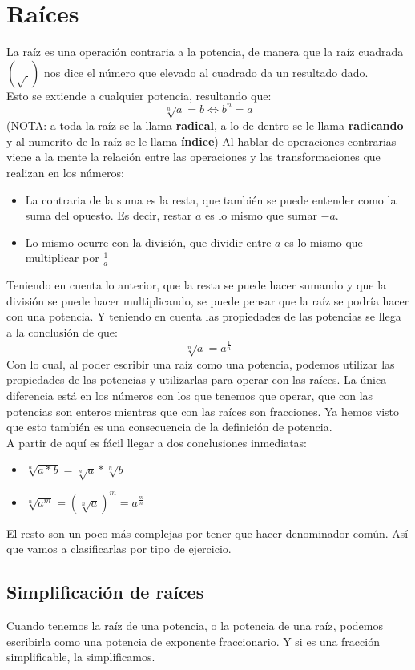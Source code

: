 \documentclass[a4paper,11pt,answers]{exam}
\begin{document}
\section{Raíces}
La raíz es una operación contraria a la potencia, de manera que la raíz cuadrada $\left(\sqrt{\ }\right)$ nos dice el número que elevado al cuadrado da un resultado dado.\\
Esto se extiende a cualquier potencia, resultando que:
\[\sqrt[n]{a} = b \Leftrightarrow b^n = a\]
(NOTA: a toda la raíz se la llama \textbf{radical}, a lo de dentro se le llama \textbf{radicando} y al numerito de la raíz se le llama \textbf{índice})
Al hablar de operaciones contrarias viene a la mente la relación entre las operaciones y las transformaciones que realizan en los números:
\begin{itemize}
	\item La contraria de la suma es la resta, que también se puede entender como la suma del opuesto. Es decir, restar $a$ es lo mismo que sumar $-a$.
	\item Lo mismo ocurre con la división, que dividir entre $a$ es lo mismo que multiplicar por $\frac{1}{a}$
\end{itemize}
Teniendo en cuenta lo anterior, que la resta se puede hacer sumando y que la división se puede hacer multiplicando, se puede pensar que la raíz se podría hacer con una potencia. Y teniendo en cuenta las propiedades de las potencias se llega a la conclusión de que:
\Large
\[\sqrt[n]{a} = a^{\frac{1}{n}}\]
\normalsize
Con lo cual, al poder escribir una raíz como una potencia, podemos utilizar las propiedades de las potencias y utilizarlas para operar con las raíces. La única diferencia está en los números con los que tenemos que operar, que con las potencias son enteros mientras que con las raíces son fracciones. Ya hemos visto que esto también es una consecuencia de la definición de potencia.\\
A partir de aquí es fácil llegar a dos conclusiones inmediatas:
\begin{itemize}
	\item $\sqrt[n]{a*b} = \sqrt[n]{a} * \sqrt[n]{b}$
	\item $\sqrt[n]{a^m} = \left(\sqrt[n]{a}\right)^m = a^{\frac{m}{n}}$
\end{itemize}

El resto son un poco más complejas por tener que hacer denominador común. Así que vamos a clasificarlas por tipo de ejercicio.
\subsection{Simplificación de raíces} \label{simplirad}
Cuando tenemos la raíz de una potencia, o la potencia de una raíz, podemos escribirla como una potencia de exponente fraccionario. Y si es una fracción simplificable, la simplificamos.\\
\end{document}
